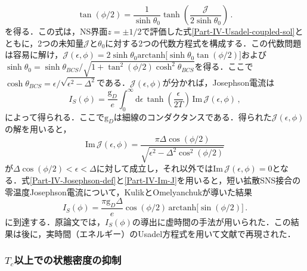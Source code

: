 \documentclass[a4paper,11pt]{ltjsarticle}
\def\d{\mathrm{d}}
\begin{document}
\begin{equation}
\tan(\phi/2)=\frac{1}{\sinh\theta_{0}}
\tanh\left(\frac{\mathcal{J}}{2\sinh\theta_{0}}\right)\,.
\end{equation}
を得る．この式は，NS界面$z=\pm1/2$で評価した式\eqref{Part-IV-Usadel-coupled-sol}とともに，2つの未知量$\mathcal{J}$と$\theta_{0}$に対する2つの代数方程式を構成する．この代数問題は容易に解け，$\mathcal{J}(\epsilon,\phi)=2\sinh\theta_{0}\mathrm{arctanh}\big[\sinh\theta_{0}\tan(\phi/2)\big]$および$\sinh\theta_{0}=\sinh\theta_{BCS}/\sqrt{1+\tan^{2}(\phi/2)\cosh^{2}\theta_{BCS}}$を得る．ここで$\cosh\theta_{BCS}=\epsilon/\sqrt{\epsilon^{2}-\Delta^{2}}$である．$\mathcal{J}(\epsilon,\phi)$が分かれば，Josephson電流は
\begin{equation}\label{Part-IV-Josephson-def}
I_{S}(\phi)=\frac{\mathrm{g}_{D}}{e}\int^{\infty}_{0}\d\epsilon\,
\tanh\left(\frac{\epsilon}{2T}\right)\,\mathrm{Im}\,\mathcal{J}(\epsilon,\phi)\,,
\end{equation}
によって得られる．ここで$\mathrm{g}_{D}$は細線のコンダクタンスである．得られた$\mathcal{J}(\epsilon,\phi)$の解を用いると，
\begin{equation}\label{Part-IV-Im-J}
\mathrm{Im}\, \mathcal{J}(\epsilon,\phi)=\frac{\pi\Delta\cos(\phi/2)}
{\sqrt{\epsilon^{2}-\Delta^{2}\cos^{2}(\phi/2)}}
\end{equation}
が$\Delta\cos(\phi/2)<\epsilon<\Delta$に対して成立し，それ以外では$\mathrm{Im}\,\mathcal{J}(\epsilon,\phi)=0$となる．式\eqref{Part-IV-Josephson-def}と\eqref{Part-IV-Im-J}を用いると，短い拡散SNS接合の零温度Josephson電流について，KulikとOmelyanchuk\cite{KulikOmelyanchuk}が導いた結果
\begin{equation}
I_{S}(\phi)=\frac{\pi\mathrm{g}_{D}\Delta}{e}\cos(\phi/2)\,
\mathrm{arctanh}\big[\sin(\phi/2)\big]\,.
\end{equation}
に到達する．原論文\cite{KulikOmelyanchuk}では，$I_{S}(\phi)$の導出に虚時間の手法が用いられた．この結果は後に，実時間（エネルギー）のUsadel方程式を用いて文献\cite{Heikkila,Levchenko-Js}で再現された．


\subsubsection{$T_c$以上での状態密度の抑制}\label{app_Part-IV-3}
\end{document}
